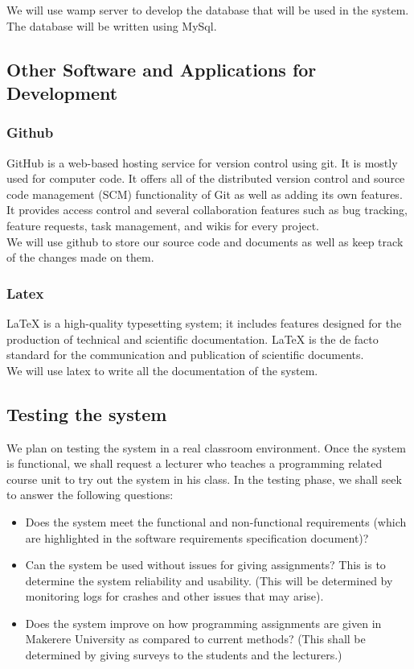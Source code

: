 \documentclass[12pt]{article}
\begin{document}
		\noindent We will use wamp server to develop the database that will be used in the system. The database will be written using MySql.

		
	\subsection{Other Software and Applications for Development}
		\subsubsection{Github}
		GitHub  is a web-based hosting service for version control using git. It is mostly used for computer code. It offers all of the distributed version control and source code management (SCM) functionality of Git as well as adding its own features. It provides access control and several collaboration features such as bug tracking, feature requests, task management, and wikis for every project\cite{git}.\\
		
		\noindent We will use github to store our source code and documents as well as keep track of the changes made on them.
		 
		\subsubsection{Latex}
		LaTeX is a high-quality typesetting system; it includes features designed for the production of technical and scientific documentation. LaTeX is the de facto standard for the communication and publication of scientific documents\cite{latex}.\\
		
		\noindent We will use latex to write all the documentation of the system.
	
	\subsection{Testing the system}
	We plan on testing the system in a real classroom environment. Once the system is functional, we shall request a lecturer who teaches a programming related course unit to try out the system in his class. In the testing phase, we shall seek to answer the following questions:
	\begin{itemize}
		\item Does the system meet the functional and non-functional requirements (which are highlighted in the software requirements specification document)?
		\item Can the system be used without issues for giving assignments? This is to determine the system reliability and usability. (This will be determined by monitoring logs for crashes and other issues that may arise).
		\item Does the system improve on how programming assignments are given in Makerere University as compared to current methods? (This shall be determined by giving surveys to the students and the lecturers.)
	\end{itemize}
	
\end{document}

